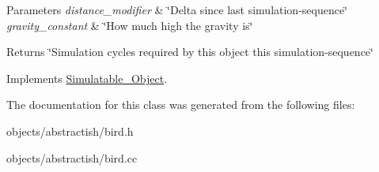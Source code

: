 \begin{DoxyParams}{Parameters}
{\em distance\+\_\+modifier} & \char`\"{}\+Delta since last simulation-\/sequence\char`\"{} \\
\hline
{\em gravity\+\_\+constant} & \char`\"{}\+How much high the gravity is\char`\"{} \\
\hline
\end{DoxyParams}
\begin{DoxyReturn}{Returns}
\char`\"{}\+Simulation cycles required by this object this simulation-\/sequence\char`\"{} 
\end{DoxyReturn}


Implements \hyperlink{classSimulatable__Object_abe7c02fe250ef5be42011890d8a7b37b}{Simulatable\+\_\+\+Object}.



The documentation for this class was generated from the following files\+:\begin{DoxyCompactItemize}
\item 
objects/abstractish/bird.\+h\item 
objects/abstractish/bird.\+cc\end{DoxyCompactItemize}
